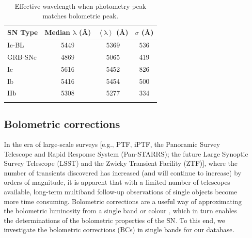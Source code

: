\documentclass[a4paper,fleqn,usenatbib]{mnras}
\begin{document}
\begin{table}
 \centering
 \begin{minipage}{80mm}
  \caption{Effective wavelength when photometry peak matches bolometric peak.}
 \begin{tabular}{lccc}
  \hline
 SN Type& Median $\mathrm{\lambda}$ (\AA) & $\left\langle\mathrm{\lambda}\right\rangle$ (\AA) & $\sigma$ (\AA)\\
  \hline
Ic-BL & 5449 &  $5369$ & $536$\\
GRB-SNe & 4869 & 5065 & 419\\
Ic & 5616 & 5452 & 826\\
Ib & 5416 & 5454 & 500\\
IIb & 5308 & 5277 & 334\\
\hline
 \label{timebandbol}
\end{tabular}
\end{minipage}
\end{table}

\subsection{Bolometric corrections}
In the era of large-scale surveys [e.g., PTF, iPTF, the Panoramic Survey Telescope and Rapid Response System (Pan-STARRS); the future Large Synoptic Survey Telescope (LSST) and the Zwicky Transient Facility (ZTF)], where the number of transients discovered has increased (and will continue to increase) by orders of magnitude, it is apparent that with a limited number of telescopes available, long-term multiband follow-up observations of single objects become more time consuming. Bolometric corrections are a useful way of approximating the bolometric luminosity from a single band or colour \citep{Lyman2014}, which in turn enables the determinations of the bolometric properties of the SN. To this end, we investigate the bolometric corrections (BCs) in single bands for our database. 
\end{document}
